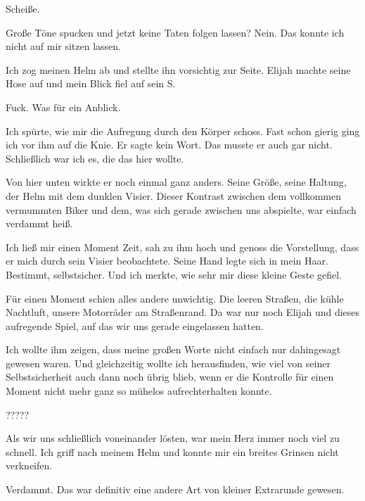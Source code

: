 Scheiße.

Große Töne spucken und jetzt keine Taten folgen lassen? Nein. Das konnte ich nicht auf mir sitzen lassen.

Ich zog meinen Helm ab und stellte ihn vorsichtig zur Seite. Elijah machte seine Hose auf und mein Blick fiel auf sein S.

Fuck. Was für ein Anblick.

Ich spürte, wie mir die Aufregung durch den Körper schoss. Fast schon gierig ging ich vor ihm auf die Knie. Er sagte kein Wort. Das musste er auch gar nicht. Schließlich war ich es, die das hier wollte.

Von hier unten wirkte er noch einmal ganz anders. Seine Größe, seine Haltung, der Helm mit dem dunklen Visier. Dieser Kontrast zwischen dem vollkommen vermummten Biker und dem, was sich gerade zwischen uns abspielte, war einfach verdammt heiß.

Ich ließ mir einen Moment Zeit, sah zu ihm hoch und genoss die Vorstellung, dass er mich durch sein Visier beobachtete. Seine Hand legte sich in mein Haar. Bestimmt, selbstsicher. Und ich merkte, wie sehr mir diese kleine Geste gefiel.

Für einen Moment schien alles andere unwichtig. Die leeren Straßen, die kühle Nachtluft, unsere Motorräder am Straßenrand. Da war nur noch Elijah und dieses aufregende Spiel, auf das wir uns gerade eingelassen hatten.

Ich wollte ihm zeigen, dass meine großen Worte nicht einfach nur dahingesagt gewesen waren. Und gleichzeitig wollte ich herausfinden, wie viel von seiner Selbstsicherheit auch dann noch übrig blieb, wenn er die Kontrolle für einen Moment nicht mehr ganz so mühelos aufrechterhalten konnte.

?????

Als wir uns schließlich voneinander lösten, war mein Herz immer noch viel zu schnell. Ich griff nach meinem Helm und konnte mir ein breites Grinsen nicht verkneifen.

Verdammt. Das war definitiv eine andere Art von kleiner Extrarunde gewesen.
